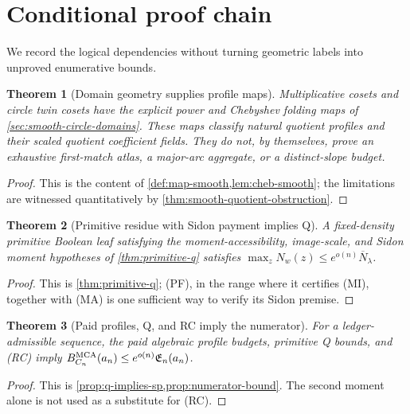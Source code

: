 \documentclass[12pt,a4paper]{amsart}
\numberwithin{equation}{section}
\newtheorem{theorem}{Theorem}[section]
\theoremstyle{remark}
\newcommand{\barN}{\overline N}
\begin{document}
\section{Conditional proof chain}\label{sec:complete-chain}

We record the logical dependencies without turning geometric labels into
unproved enumerative bounds.

\begin{theorem}[Domain geometry supplies profile maps]\label{thm:domain-to-ledger-final}
Multiplicative cosets and circle twin cosets have the explicit power and
Chebyshev folding maps of \cref{sec:smooth-circle-domains}.  These maps
classify natural quotient profiles and their scaled quotient coefficient
fields.  They do
not, by themselves, prove an exhaustive first-match atlas, a major-arc
aggregate, or a distinct-slope budget.
\end{theorem}

\begin{proof}
This is the content of \cref{def:map-smooth,lem:cheb-smooth}; the limitations
are witnessed quantitatively by \cref{thm:smooth-quotient-obstruction}.
\end{proof}

\begin{theorem}[Primitive residue with Sidon payment implies Q]\label{thm:primitive-to-q-final}
A fixed-density primitive Boolean leaf satisfying the moment-accessibility,
image-scale, and Sidon moment hypotheses of \cref{thm:primitive-q}
satisfies \(\max_zN_w(z)\le e^{o(n)}\barN_\lambda\).
\end{theorem}

\begin{proof}
This is \cref{thm:primitive-q}; \textup{(PF)}, in the range where it
certifies \textup{(MI)}, together with \textup{(MA)} is one sufficient
way to verify its Sidon premise.
\end{proof}

\begin{theorem}[Paid profiles, Q, and RC imply the numerator]\label{thm:q-sp-to-mca-final}
For a ledger-admissible sequence, the paid algebraic profile budgets,
primitive Q bounds, and \textup{(RC)} imply
\(B_{C_n}^{\rm MCA}(a_n)\le e^{o(n)}\mathfrak E_n(a_n)\).
\end{theorem}

\begin{proof}
This is \cref{prop:q-implies-sp,prop:numerator-bound}.  The second moment
alone is not used as a substitute for \textup{(RC)}.
\end{proof}
\end{document}
